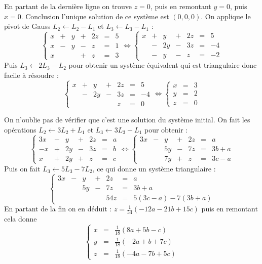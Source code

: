{{En partant de la dernière ligne on trouve $z=0$, puis en remontant $y=0$, puis $x=0$.
Conclusion l'unique solution de ce système est $(0,0,0)$.
On applique le pivot de Gauss $L_2 \leftarrow L_2-L_1$ et $L_3 \leftarrow L_3-L_1$ :
$$ \left\{
    \begin{array}{rcrcrcl}
       x &+&  y &+& 2z &=& 5  \\
       x &-&  y &-&  z &=& 1  \\
       x & &    &+&  z &=& 3    
    \end{array}
  \right. 
\iff
 \left\{
    \begin{array}{rcrcrcl}
       x &+&  y &+&  2z &=& 5  \\
        &-&  2y &-&  3z &=& -4  \\
        &-&  y  &-&  z  &=& -2    
    \end{array}
  \right. 
$$
Puis $L_3\leftarrow 2L_3-L_2$ pour obtenir un système équivalent qui est triangulaire donc facile à résoudre :
$$ \left\{
    \begin{array}{rcrcrcl}
       x &+&  y &+&  2z &=& 5  \\
        &-&  2y &-&  3z &=& -4  \\
        &&    &&  z  &=& 0    
    \end{array}
  \right. 
\iff \left\{
    \begin{array}{rcl}
        x &=& 3 \\
        y &=& 2 \\
        z &=& 0    
    \end{array} \right.
$$

On n'oublie pas de vérifier que c'est une solution du système initial.
On fait les opérations $L_2\leftarrow 3L_2+L_1$ et $L_3\leftarrow 3L_3-L_1$ pour obtenir :
$$\left\{
    \begin{array}{rcrcrcl}
      3x &-& y  &+& 2z &=& a \\
      -x &+& 2y &-& 3z &=& b \\
       x &+& 2y &+&  z &=& c 
    \end{array}
  \right.
\iff
\left\{
    \begin{array}{rcrcrcl}
      3x &-& y  &+& 2z &=& a \\
         & & 5y &-& 7z &=& 3b+a \\
         & & 7y &+&  z &=& 3c-a 
    \end{array}
  \right.
  $$
Puis on fait $L_3\leftarrow 5L_3-7L_2$, ce qui donne un système triangulaire :
$$\left\{
    \begin{array}{rcrcrcl}
      3x &-& y  &+& 2z &=& a \\
         & & 5y &-& 7z &=& 3b+a \\
         & &    & & 54z &=& 5(3c-a)-7(3b+a) 
    \end{array}
  \right.
  $$
En partant de la fin on en déduit : $z= \frac{1}{54}(-12a-21b+15c)$ puis en remontant cela donne
$$\left\{
    \begin{array}{rcl}
         x &=& \frac{1}{18}(8a+5b-c) \\
         y &=& \frac{1}{18}(-2a+b+7c) \\
         z &=& \frac{1}{18}(-4a-7b+5c)
    \end{array}
  \right.
  $$
}
}
